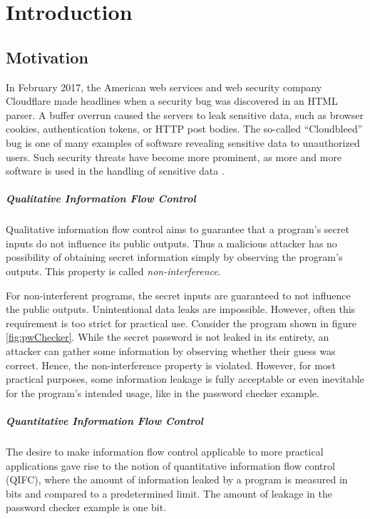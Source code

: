 \chapter{Introduction}\label{sec:intro}

\section{Motivation}

In February 2017, the American web services and web security company Cloudflare made headlines when a security bug was discovered in an HTML parser. A buffer overrun caused the servers to leak sensitive data, such as browser cookies, authentication tokens, or HTTP post bodies. The so-called \enquote{Cloudbleed} bug is one of many examples of software revealing sensitive data to unauthorized users. Such security threats have become more prominent, as more and more software is used in the handling of sensitive data \cite{cloudbleedIssue, cloudbleedReport}.

\paragraph{Qualitative Information Flow Control}
Qualitative information flow control aims to guarantee that a program's secret inputs do not influence its public outputs. Thus a malicious attacker has no possibility of obtaining secret information simply by observing the program's outputs. This property is called \emph{non-interference}. 

For non-interferent programs, the secret inputs are guaranteed to not influence the public outputs. Unintentional data leaks are impossible. However, often this requirement is too strict for practical use. Consider the program shown in figure \ref{fig:pwChecker}. While the secret password is not leaked in its entirety, an attacker can gather some information by observing whether their guess was correct. Hence, the non-interference property is violated. However, for most practical purposes, some information leakage is fully acceptable or even inevitable for the program's intended usage, like in the password checker example.

\paragraph{Quantitative Information Flow Control}
The desire to make information flow control applicable to more practical applications gave rise to the notion of quantitative information flow control (QIFC), where the amount of information leaked by a program is measured in bits and compared to a predetermined limit. The amount of leakage in the password checker example is one bit.

